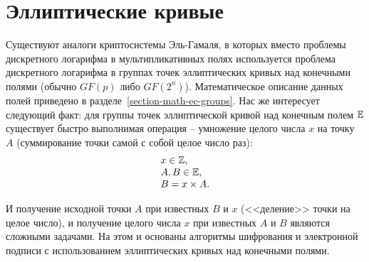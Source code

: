 \section{Эллиптические кривые}\label{section-elliptic-curve-cryptosystems}

Существуют аналоги криптосистемы Эль-Гамаля, в которых вместо проблемы дискретного логарифма в мультипликативных полях используется проблема дискретного логарифма в группах точек эллиптических кривых над конечными полями (обычно $GF(p)$ либо $GF(2^n)$). Математическое описание данных полей приведено в разделе~\ref{section-math-ec-groups}. Нас же интересует следующий факт: для группы точек эллиптической кривой над конечным полем $\mathbb{E}$ существует быстро выполнимая операция -- умножение целого числа $x$ на точку $A$ (суммирование точки самой с собой целое число раз):
\[ \begin{array}{l}
	x \in \mathbb{Z}, \\
	A, B \in \mathbb{E}, \\
	B = x \times A. \\
\end{array} \]

И получение исходной точки $A$ при известных $B$ и $x$ (<<деление>> точки на целое число), и получение целого числа $x$ при известных $A$ и $B$ являются сложными задачами. На этом и основаны алгоритмы шифрования и электронной подписи с использованием эллиптических кривых над конечными полями.





